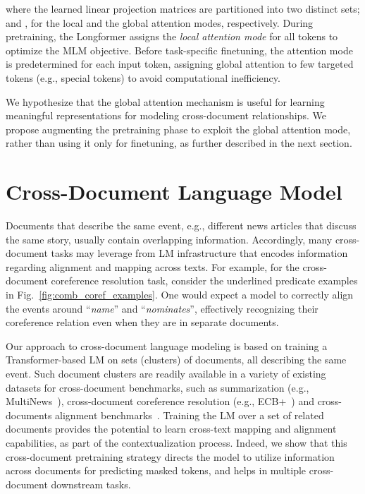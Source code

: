 \documentclass[11pt,a4paper]{article}
\begin{document}
where the learned linear projection matrices  are partitioned into two distinct sets;  and , for the local and the global attention modes, respectively. During pretraining, the Longformer assigns the \emph{local attention mode} for all tokens to optimize the MLM objective. Before task-specific finetuning, the attention mode is predetermined for each input token, assigning global attention to few targeted tokens (e.g., special tokens) to avoid computational inefficiency.

We hypothesize that the global attention mechanism is useful for learning meaningful representations for modeling cross-document relationships. We propose augmenting the pretraining phase to exploit the global attention mode, rather than using it only for finetuning, as further described in the next section. \section{Cross-Document Language Model}
\label{sec:cdmlm}

Documents that describe the same event, e.g., different news articles that discuss the same story, usually contain overlapping information. Accordingly, many cross-document tasks may leverage from LM infrastructure that encodes information regarding alignment and mapping across texts. For example, for the cross-document coreference resolution task, consider the underlined predicate examples in Fig.~\ref{fig:comb_coref_examples}. One would expect a model to correctly align the events around ``\emph{name}'' and ``\emph{nominates}'', effectively recognizing their coreference relation even when they are in separate documents.


Our approach to cross-document language modeling is based on training a Transformer-based LM on sets (clusters) of documents, all describing the same event. 
Such document clusters are readily available in a variety of existing datasets for cross-document benchmarks, such as summarization (e.g., MultiNews~\cite{fabbri2019multinews}), cross-document coreference resolution (e.g., ECB+~\cite{cybulska-vossen-2014-using}) and cross-documents alignment benchmarks~\cite{zhou-etal-2020-multilevel}.
Training the LM over a set of related documents provides the potential to learn cross-text mapping and alignment capabilities, as part of the contextualization process. 
Indeed, we show that this cross-document pretraining strategy directs the model to utilize information across documents for predicting masked tokens, and helps in multiple cross-document downstream tasks. 
\end{document}
